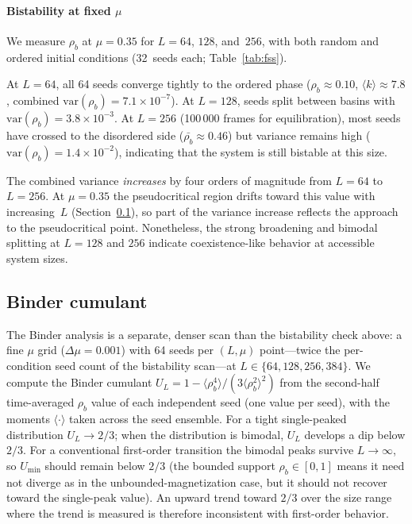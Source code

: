 \documentclass[preprint,12pt]{elsarticle}
\newcommand{\rb}{\rho_b}              %
\newcommand{\kavg}{\langle k \rangle} %
\newcommand{\Lsys}{L}                 %
\begin{document}
\paragraph{Bistability at fixed $\mu$}
We measure $\rb$ at $\mu = 0.35$ for $\Lsys = 64$, $128$,
and~$256$, with both random and ordered initial conditions
(32~seeds each; Table~\ref{tab:fss}).

At $\Lsys = 64$, all 64 seeds converge tightly to the ordered
phase ($\rb \approx 0.10$, $\kavg \approx 7.8$,
combined $\mathrm{var}(\rb) = 7.1 \times 10^{-7}$).
At $\Lsys = 128$, seeds split between basins with
$\mathrm{var}(\rb) = 3.8 \times 10^{-3}$.
At $\Lsys = 256$ (100\,000 frames for equilibration),
most seeds have crossed to the disordered side
($\bar{\rb} \approx 0.46$) but variance remains high
($\mathrm{var}(\rb) = 1.4 \times 10^{-2}$),
indicating that the system is still bistable at this size.

The combined variance \emph{increases} by four orders of
magnitude from $\Lsys = 64$ to $\Lsys = 256$.
At $\mu = 0.35$ the pseudocritical region drifts toward
this value with increasing~$\Lsys$
(Section~\ref{sec:binder}), so part of the variance
increase reflects the approach to the pseudocritical point.
Nonetheless, the strong broadening and bimodal splitting
at $\Lsys = 128$ and $256$ indicate coexistence-like
behavior at accessible system sizes.

\subsection{Binder cumulant}
\label{sec:binder}

The Binder analysis is a separate, denser scan than the
bistability check above: a fine $\mu$ grid
($\Delta\mu = 0.001$) with 64 seeds per $(\Lsys, \mu)$
point---twice the per-condition seed count of the
bistability scan---at $\Lsys \in \{64, 128, 256, 384\}$.
We compute the Binder cumulant
$U_\Lsys = 1 - \langle \rb^4 \rangle /
(3 \langle \rb^2 \rangle^2)$
from the second-half time-averaged $\rb$ value of each
independent seed (one value per seed), with the moments
$\langle \cdot \rangle$ taken across the seed ensemble.
For a tight single-peaked distribution $U_\Lsys \to 2/3$;
when the distribution is bimodal, $U_\Lsys$ develops a dip
below $2/3$.
For a conventional first-order transition the bimodal peaks
survive $\Lsys \to \infty$, so $U_\mathrm{min}$ should remain
below $2/3$ (the bounded support $\rb \in [0, 1]$ means it
need not diverge as in the unbounded-magnetization case, but
it should not recover toward the single-peak value).
An upward trend toward $2/3$ over the size range where the
trend is measured is therefore inconsistent with first-order
behavior.
\end{document}
